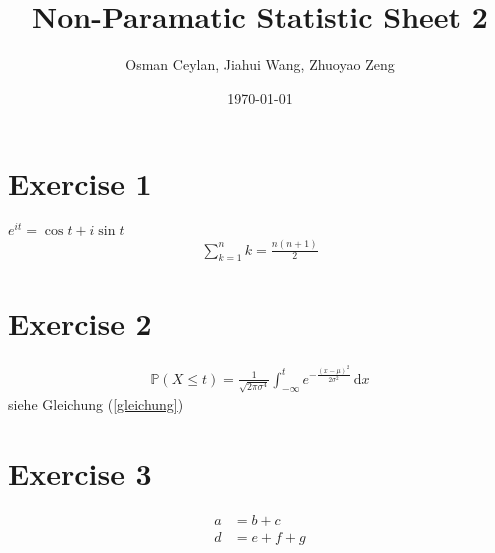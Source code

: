 \documentclass{article}
\title{Non-Paramatic Statistic Sheet 2}
\author{Osman Ceylan, Jiahui Wang, Zhuoyao Zeng}
\date{\today}
\begin{document}
\maketitle
\section*{Exercise 1}
$e^{i t}=\cos t + i \sin t$
\begin{align*}
\sum_{k=1}^n k=\frac{n(n+1)}{2}
\end{align*}
\section*{Exercise 2}
\begin{align}
\mathbb{P}(X \leq t)= \frac{1}{\sqrt{2\pi \sigma^4}} \int_{-\infty}^t e^{-\frac{(x-\mu)^2}{2\sigma^2}} \,\mathrm{d}x \label{gleichung}
\end{align}
siehe Gleichung (\ref{gleichung})
\section*{Exercise 3}
\begin{align*}
a&=b+c \\
d&=e+f+g
\end{align*}
\end{document}
